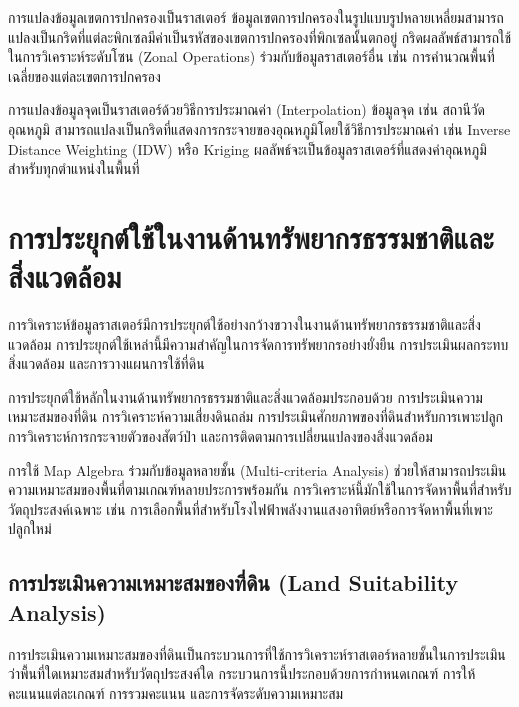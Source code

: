 \begin{ex}
การแปลงข้อมูลเขตการปกครองเป็นราสเตอร์ ข้อมูลเขตการปกครองในรูปแบบรูปหลายเหลี่ยมสามารถแปลงเป็นกริดที่แต่ละพิกเซลมีค่าเป็นรหัสของเขตการปกครองที่พิกเซลนั้นตกอยู่ กริดผลลัพธ์สามารถใช้ในการวิเคราะห์ระดับโซน (Zonal Operations) ร่วมกับข้อมูลราสเตอร์อื่น เช่น การคำนวณพื้นที่เฉลี่ยของแต่ละเขตการปกครอง
\end{ex}

\begin{ex}
การแปลงข้อมูลจุดเป็นราสเตอร์ด้วยวิธีการประมาณค่า (Interpolation) ข้อมูลจุด เช่น สถานีวัดอุณหภูมิ สามารถแปลงเป็นกริดที่แสดงการกระจายของอุณหภูมิโดยใช้วิธีการประมาณค่า เช่น Inverse Distance Weighting (IDW) หรือ Kriging ผลลัพธ์จะเป็นข้อมูลราสเตอร์ที่แสดงค่าอุณหภูมิสำหรับทุกตำแหน่งในพื้นที่
\end{ex}

\section{การประยุกต์ใช้ในงานด้านทรัพยากรธรรมชาติและสิ่งแวดล้อม}

การวิเคราะห์ข้อมูลราสเตอร์มีการประยุกต์ใช้อย่างกว้างขวางในงานด้านทรัพยากรธรรมชาติและสิ่งแวดล้อม การประยุกต์ใช้เหล่านี้มีความสำคัญในการจัดการทรัพยากรอย่างยั่งยืน การประเมินผลกระทบสิ่งแวดล้อม และการวางแผนการใช้ที่ดิน

การประยุกต์ใช้หลักในงานด้านทรัพยากรธรรมชาติและสิ่งแวดล้อมประกอบด้วย การประเมินความเหมาะสมของที่ดิน การวิเคราะห์ความเสี่ยงดินถล่ม การประเมินศักยภาพของที่ดินสำหรับการเพาะปลูก การวิเคราะห์การกระจายตัวของสัตว์ป่า และการติดตามการเปลี่ยนแปลงของสิ่งแวดล้อม

การใช้ Map Algebra ร่วมกับข้อมูลหลายชั้น (Multi-criteria Analysis) ช่วยให้สามารถประเมินความเหมาะสมของพื้นที่ตามเกณฑ์หลายประการพร้อมกัน การวิเคราะห์นี้มักใช้ในการจัดหาพื้นที่สำหรับวัตถุประสงค์เฉพาะ เช่น การเลือกพื้นที่สำหรับโรงไฟฟ้าพลังงานแสงอาทิตย์หรือการจัดหาพื้นที่เพาะปลูกใหม่

\subsection{การประเมินความเหมาะสมของที่ดิน (Land Suitability Analysis)}

การประเมินความเหมาะสมของที่ดินเป็นกระบวนการที่ใช้การวิเคราะห์ราสเตอร์หลายชั้นในการประเมินว่าพื้นที่ใดเหมาะสมสำหรับวัตถุประสงค์ใด กระบวนการนี้ประกอบด้วยการกำหนดเกณฑ์ การให้คะแนนแต่ละเกณฑ์ การรวมคะแนน และการจัดระดับความเหมาะสม

